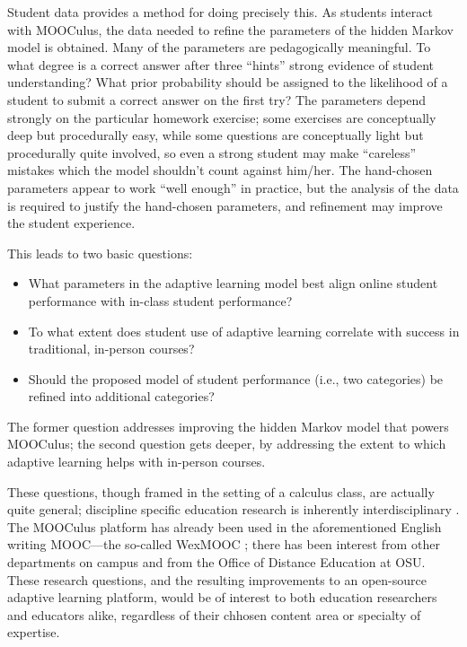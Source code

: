 \documentclass[12pt]{article}
\begin{document}
Student data provides a method for doing precisely this.  As students
interact with MOOCulus, the data needed to refine the parameters of
the hidden Markov model is obtained.  Many of the parameters are
pedagogically meaningful.  To what degree is a correct answer after
three ``hints'' strong evidence of student understanding?  What prior
probability should be assigned to the likelihood of a student to
submit a correct answer on the first try?  The parameters depend
strongly on the particular homework exercise; some exercises are
conceptually deep but procedurally easy, while some questions are
conceptually light but procedurally quite involved, so even a strong
student may make ``careless'' mistakes which the model shouldn't count
against him/her.  The hand-chosen parameters appear to work ``well
enough'' in practice, but the analysis of the data is required to
justify the hand-chosen parameters, and refinement may improve the
student experience.

This leads to two basic questions:
\begin{itemize}
\item What parameters in the adaptive learning model best align online
  student performance with in-class student performance?
\item To what extent does student use of adaptive learning correlate
  with success in traditional, in-person courses?
\item Should the proposed model of student performance (i.e., two
  categories) be refined into additional categories?  
\end{itemize}
The former question addresses improving the hidden Markov model that
powers MOOCulus; the second question gets deeper, by addressing the
extent to which adaptive learning helps with in-person courses.

These questions, though framed in the setting of a calculus class, are
actually quite general; discipline specific education research is
inherently interdisciplinary \cite{dber-report}.  The MOOCulus
platform has already been used in the aforementioned English writing
MOOC---the so-called WexMOOC \parencite{gates-foundation-grant}; there
has been interest from other departments on campus and from the Office
of Distance Education at OSU.  These research questions, and the
resulting improvements to an open-source adaptive learning platform,
would be of interest to both education researchers and educators
alike, regardless of their chhosen content area or specialty of
expertise.
\end{document}
